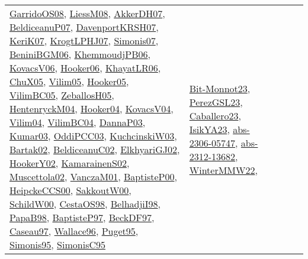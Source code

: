 {\begin{longtable}{llp{6cm}p{6cm}p{6cm}}
\href{articles/GarridoOS08.pdf}{GarridoOS08}\cite{GarridoOS08}, \href{articles/LiessM08.pdf}{LiessM08}\cite{LiessM08}, \href{papers/AkkerDH07.pdf}{AkkerDH07}\cite{AkkerDH07}, \href{papers/BeldiceanuP07.pdf}{BeldiceanuP07}\cite{BeldiceanuP07}, \href{papers/DavenportKRSH07.pdf}{DavenportKRSH07}\cite{DavenportKRSH07}, \href{papers/KeriK07.pdf}{KeriK07}\cite{KeriK07}, \href{papers/KrogtLPHJ07.pdf}{KrogtLPHJ07}\cite{KrogtLPHJ07}, \href{articles/Simonis07.pdf}{Simonis07}\cite{Simonis07}, \href{papers/BeniniBGM06.pdf}{BeniniBGM06}\cite{BeniniBGM06}, \href{papers/KhemmoudjPB06.pdf}{KhemmoudjPB06}\cite{KhemmoudjPB06}, \href{papers/KovacsV06.pdf}{KovacsV06}\cite{KovacsV06}, \href{articles/Hooker06.pdf}{Hooker06}\cite{Hooker06}, \href{articles/KhayatLR06.pdf}{KhayatLR06}\cite{KhayatLR06}, \href{papers/ChuX05.pdf}{ChuX05}\cite{ChuX05}, \href{papers/Vilim05.pdf}{Vilim05}\cite{Vilim05}, \href{articles/Hooker05.pdf}{Hooker05}\cite{Hooker05}, \href{articles/VilimBC05.pdf}{VilimBC05}\cite{VilimBC05}, \href{articles/ZeballosH05.pdf}{ZeballosH05}\cite{ZeballosH05}, \href{papers/HentenryckM04.pdf}{HentenryckM04}\cite{HentenryckM04}, \href{papers/Hooker04.pdf}{Hooker04}\cite{Hooker04}, \href{papers/KovacsV04.pdf}{KovacsV04}\cite{KovacsV04}, \href{papers/Vilim04.pdf}{Vilim04}\cite{Vilim04}, \href{papers/VilimBC04.pdf}{VilimBC04}\cite{VilimBC04}, \href{papers/DannaP03.pdf}{DannaP03}\cite{DannaP03}, \href{papers/Kumar03.pdf}{Kumar03}\cite{Kumar03}, \href{papers/OddiPCC03.pdf}{OddiPCC03}\cite{OddiPCC03}, \href{articles/KuchcinskiW03.pdf}{KuchcinskiW03}\cite{KuchcinskiW03}, \href{papers/Bartak02.pdf}{Bartak02}\cite{Bartak02}, \href{papers/BeldiceanuC02.pdf}{BeldiceanuC02}\cite{BeldiceanuC02}, \href{papers/ElkhyariGJ02.pdf}{ElkhyariGJ02}\cite{ElkhyariGJ02}, \href{papers/HookerY02.pdf}{HookerY02}\cite{HookerY02}, \href{papers/KamarainenS02.pdf}{KamarainenS02}\cite{KamarainenS02}, \href{papers/Muscettola02.pdf}{Muscettola02}\cite{Muscettola02}, \href{papers/VanczaM01.pdf}{VanczaM01}\cite{VanczaM01}, \href{articles/BaptisteP00.pdf}{BaptisteP00}\cite{BaptisteP00}, \href{articles/HeipckeCCS00.pdf}{HeipckeCCS00}\cite{HeipckeCCS00}, \href{articles/SakkoutW00.pdf}{SakkoutW00}\cite{SakkoutW00}, \href{articles/SchildW00.pdf}{SchildW00}\cite{SchildW00}, \href{papers/CestaOS98.pdf}{CestaOS98}\cite{CestaOS98}, \href{articles/BelhadjiI98.pdf}{BelhadjiI98}\cite{BelhadjiI98}, \href{articles/PapaB98.pdf}{PapaB98}\cite{PapaB98}, \href{papers/BaptisteP97.pdf}{BaptisteP97}\cite{BaptisteP97}, \href{papers/BeckDF97.pdf}{BeckDF97}\cite{BeckDF97}, \href{papers/Caseau97.pdf}{Caseau97}\cite{Caseau97}, \href{articles/Wallace96.pdf}{Wallace96}\cite{Wallace96}, \href{papers/Puget95.pdf}{Puget95}\cite{Puget95}, \href{papers/Simonis95.pdf}{Simonis95}\cite{Simonis95}, \href{papers/SimonisC95.pdf}{SimonisC95}\cite{SimonisC95} & \href{papers/Bit-Monnot23.pdf}{Bit-Monnot23}\cite{Bit-Monnot23}, \href{papers/PerezGSL23.pdf}{PerezGSL23}\cite{PerezGSL23}, \href{articles/Caballero23.pdf}{Caballero23}\cite{Caballero23}, \href{articles/IsikYA23.pdf}{IsikYA23}\cite{IsikYA23}, \href{articles/abs-2306-05747.pdf}{abs-2306-05747}\cite{abs-2306-05747}, \href{articles/abs-2312-13682.pdf}{abs-2312-13682}\cite{abs-2312-13682}, \href{papers/WinterMMW22.pdf}{WinterMMW22}\cite{WinterMMW22}, 
\end{longtable}}

